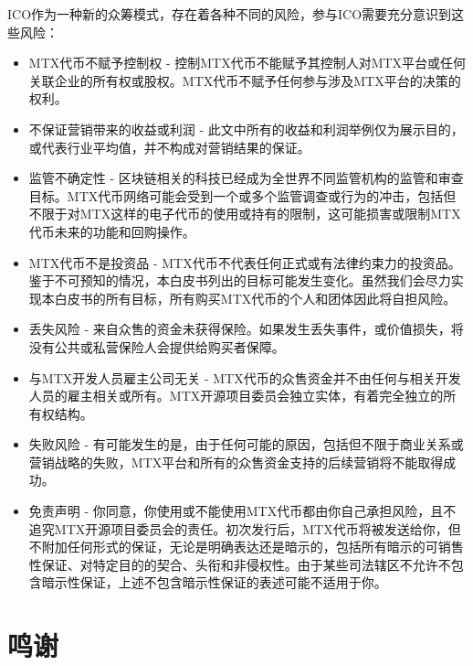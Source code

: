 \documentclass[UTF8,nofonts]{ctexart}
\begin{document}
ICO作为一种新的众筹模式，存在着各种不同的风险，参与ICO需要充分意识到这些风险：
\begin{itemize}
	\item MTX代币不赋予控制权 - 控制MTX代币不能赋予其控制人对MTX平台或任何关联企业的所有权或股权。MTX代币不赋予任何参与涉及MTX平台的决策的权利。
	\item 不保证营销带来的收益或利润 - 此文中所有的收益和利润举例仅为展示目的，或代表行业平均值，并不构成对营销结果的保证。
	\item 监管不确定性 - 区块链相关的科技已经成为全世界不同监管机构的监管和审查目标。MTX代币网络可能会受到一个或多个监管调查或行为的冲击，包括但不限于对MTX这样的电子代币的使用或持有的限制，这可能损害或限制MTX代币未来的功能和回购操作。
	\item MTX代币不是投资品 - MTX代币不代表任何正式或有法律约束力的投资品。鉴于不可预知的情况，本白皮书列出的目标可能发生变化。虽然我们会尽力实现本白皮书的所有目标，所有购买MTX代币的个人和团体因此将自担风险。
	\item 丢失风险 - 来自众售的资金未获得保险。如果发生丢失事件，或价值损失，将没有公共或私营保险人会提供给购买者保障。
	\item 与MTX开发人员雇主公司无关 - MTX代币的众售资金并不由任何与相关开发人员的雇主相关或所有。MTX开源项目委员会独立实体，有着完全独立的所有权结构。
	\item 失败风险 - 有可能发生的是，由于任何可能的原因，包括但不限于商业关系或营销战略的失败，MTX平台和所有的众售资金支持的后续营销将不能取得成功。
	\item 免责声明 - 你同意，你使用或不能使用MTX代币都由你自己承担风险，且不追究MTX开源项目委员会的责任。初次发行后，MTX代币将被发送给你，但不附加任何形式的保证，无论是明确表达还是暗示的，包括所有暗示的可销售性保证、对特定目的的契合、头衔和非侵权性。由于某些司法辖区不允许不包含暗示性保证，上述不包含暗示性保证的表述可能不适用于你。
\end{itemize}


\section{鸣谢\label{sec:acknowledgement}}



\end{document}
